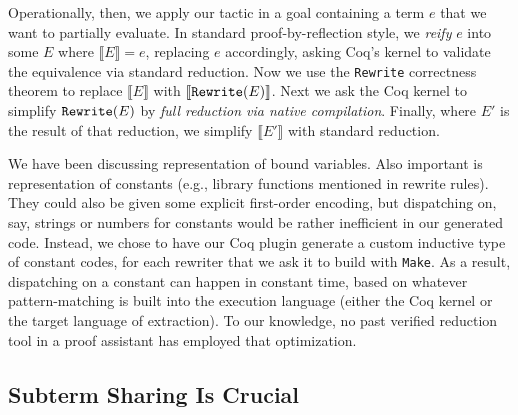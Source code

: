 \documentclass[sn-mathphys,pdflatex]{sn-jnl}%
\newcommand{\textmintinline}[2]{\text{\texttt{#2}}}
\theoremstyle{thmstyleone}%
\theoremstyle{thmstyletwo}%
\theoremstyle{thmstylethree}%
\begin{document}
Operationally, then, we apply our tactic in a goal containing a term $e$ that we want to partially evaluate.
In standard proof-by-reflection style, we \emph{reify} $e$ into some $E$ where $\llbracket E \rrbracket = e$, replacing $e$ accordingly, asking Coq's kernel to validate the equivalence via standard reduction.
Now we use the \texttt{Rewrite} correctness theorem to replace $\llbracket E \rrbracket$ with $\llbracket \textmintinline{coq}{Rewrite}(E) \rrbracket$.
Next we ask the Coq kernel to simplify $\textmintinline{coq}{Rewrite}(E)$ by \emph{full reduction via native compilation}.
Finally, where $E'$ is the result of that reduction, we simplify $\llbracket E' \rrbracket$ with standard reduction.

We have been discussing representation of bound variables.
Also important is representation of constants (e.g., library functions mentioned in rewrite rules).
They could also be given some explicit first-order encoding, but dispatching on, say, strings or numbers for constants would be rather inefficient in our generated code.
Instead, we chose to have our Coq plugin generate a custom inductive type of constant codes, for each rewriter that we ask it to build with \texttt{Make}.
As a result, dispatching on a constant can happen in constant time, based on whatever pattern-matching is built into the execution language (either the Coq kernel or the target language of extraction).
To our knowledge, no past verified reduction tool in a proof assistant has employed that optimization.


\subsection{Subterm Sharing Is Crucial}\label{sec:under-lets}
\end{document}
